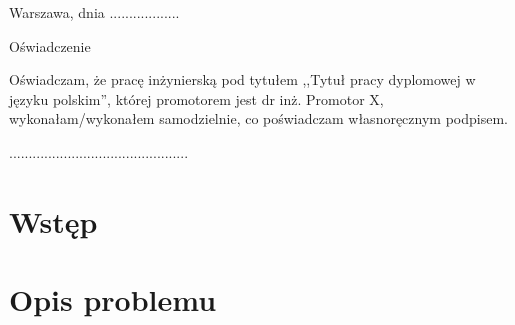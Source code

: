 \documentclass[a4paper,11pt,twoside]{report}
\theoremstyle{definition}
\newcommand{\tytul}{Tytuł pracy dyplomowej w języku polskim}
\newcommand{\type}{inżyniers} %
\newcommand{\supervisor}{dr inż. Promotor X}
\begin{document}


\null\thispagestyle{empty}\newpage

\null \hfill Warszawa, dnia ..................\\

\par\vspace{5cm}

\begin{center}
Oświadczenie
\end{center}

\indent Oświadczam, że pracę \type ką pod
tytułem ,,\tytul '', której promotorem jest \supervisor , wykonałam/wykonałem
samodzielnie, co poświadczam własnoręcznym podpisem.
\vspace{2cm}


\begin{flushright}
  \begin{minipage}{50mm}
    \begin{center}
      ..............................................

    \end{center}
  \end{minipage}
\end{flushright}

\thispagestyle{empty}
\newpage

\null\thispagestyle{empty}\newpage


\tableofcontents
\thispagestyle{empty}

\newpage %

\null\thispagestyle{empty}\newpage
\pagestyle{fancy}
\setcounter{page}{12} %

\chapter{Wstęp}

\chapter{Opis problemu}
\end{document}
